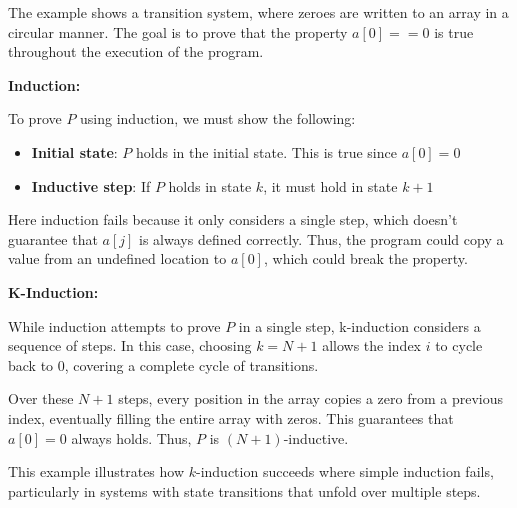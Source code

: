 \vspace{\baselineskip}The example shows a transition system, where zeroes are written to an array in a circular manner. The goal is to prove that the property $a[0] == 0$ is true throughout the execution of the program.

\newpage
\vspace{\baselineskip}\noindent \textbf{Induction:}

\vspace{\baselineskip}\noindent To prove \( P \) using induction, we must show the following:
\begin{itemize}
    \item\textbf{Initial state}: \( P \) holds in the initial state. This is true since $a[0] = 0$
    \item\textbf{Inductive step}: If \( P \) holds in state \( k \), it must hold in state \( k + 1\)
\end{itemize}

Here induction fails because it only considers a single step, which doesn't guarantee that $a[j]$ is always defined correctly. Thus, the program could copy a value from an undefined location to $a[0]$, which could break the property.

\vspace{\baselineskip}\noindent \textbf{K-Induction:}

\vspace{\baselineskip}\noindent While induction attempts to prove \( P \) in a single step, k-induction considers a sequence of steps. In this case, choosing \( k = N + 1 \) allows the index \( i \) to cycle back to 0, covering a complete cycle of transitions.

Over these \( N+1 \) steps, every position in the array copies a zero from a previous index, eventually filling the entire array with zeros. This guarantees that \( a[0] = 0 \) always holds.
Thus, \( P \) is \( (N+1) \)-inductive.

\vspace{\baselineskip}This example illustrates how \( k \)-induction succeeds where simple induction fails, particularly in systems with state transitions that unfold over multiple steps.



